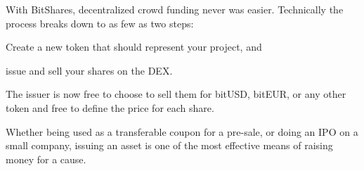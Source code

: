 With BitShares, decentralized crowd funding never was easier. Technically the
process breaks down to as few as two steps:
\begin{inparaenum}[(a)]
\item Create a new token that should represent your project, and 
\item issue and sell your shares on the DEX.
\end{inparaenum}
The issuer is now free to choose to sell them for bitUSD, bitEUR, or any other
token and free to define the price for each share.

Whether being used as a transferable coupon for a pre-sale, or doing an IPO on
a small company, issuing an asset is one of the most effective means of raising
money for a cause.
